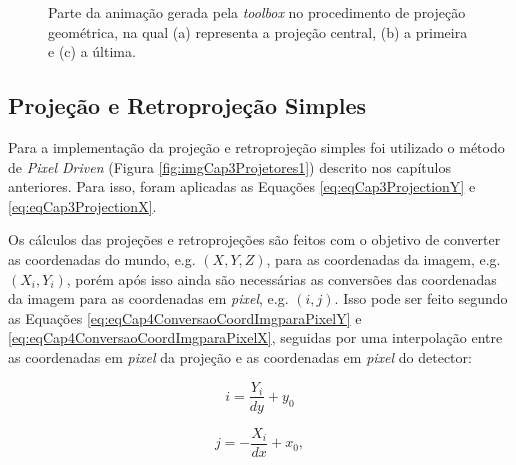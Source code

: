 \begin{figure}[h]
	\centering
	
	\caption{Parte da animação gerada pela \textit{toolbox} no procedimento de projeção geométrica, na qual (a) representa a projeção central, (b) a primeira e (c) a última.}
	
	
	
	\label{fig:imgCap4GeometriaProjecao}
\end{figure}

\subsection{Projeção e Retroprojeção Simples} 

Para a implementação da projeção e retroprojeção simples foi utilizado o método de \textit{Pixel Driven} (Figura \ref{fig:imgCap3Projetores1}) descrito nos capítulos anteriores. Para isso, foram aplicadas as Equações \ref{eq:eqCap3ProjectionY} e \ref{eq:eqCap3ProjectionX}.

 Os cálculos das projeções e retroprojeções são feitos com o objetivo de converter as coordenadas do mundo, e.g. $(X,Y,Z)$, para as coordenadas da imagem, e.g. $(X_{i},Y_{i})$, porém após isso ainda são necessárias as conversões das coordenadas da imagem para as coordenadas em \textit{pixel}, e.g. $(i,j)$. Isso pode ser feito segundo as Equações \ref{eq:eqCap4ConversaoCoordImgparaPixelY} e \ref{eq:eqCap4ConversaoCoordImgparaPixelX}, seguidas por uma interpolação entre as coordenadas em \textit{pixel} da projeção e as coordenadas em \textit{pixel} do detector:
 
 \begin{equation}
 i = \dfrac{Y_{i}}{dy} + y_{0}  
 \label{eq:eqCap4ConversaoCoordImgparaPixelY}
 \end{equation} 
 
 \begin{equation}
 j = -\dfrac{X_{i}}{dx} + x_{0},
 \label{eq:eqCap4ConversaoCoordImgparaPixelX}
 \end{equation} 
 

